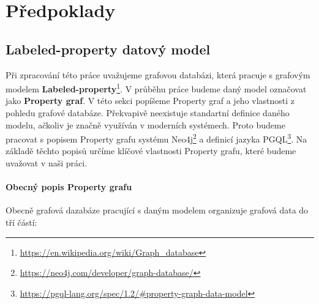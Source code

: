 \chapter{Předpoklady}
\label{requirements}

\section{Labeled-property datový model}
\label{req.propGraph}

Při zpracování této práce uvažujeme grafovou databázi, která pracuje s grafovým modelem \textbf{Labeled-property}\footnote{\url{https://en.wikipedia.org/wiki/Graph_database}}.
V průběhu práce budeme daný model označovat jako \textbf{Property graf}.
V této sekci popíšeme Property graf a jeho vlastnosti z pohledu grafové databáze.
Překvapivě neexistuje standartní definice daného modelu, ačkoliv je značně využíván v moderních systémech.
Proto budeme pracovat s popisem Property grafu systému Neo4j\footnote{\url{https://neo4j.com/developer/graph-database/}} a definicí jazyka PGQL\footnote{\url{https://pgql-lang.org/spec/1.2/\#property-graph-data-model}}.
Na základě těchto popisů určíme klíčové vlastnosti Property grafu, které budeme uvažovat v naši práci.

\subsubsection{Obecný popis Property grafu}
Obecně grafová dazabáze pracující s daným modelem organizuje grafová data do tří částí:

